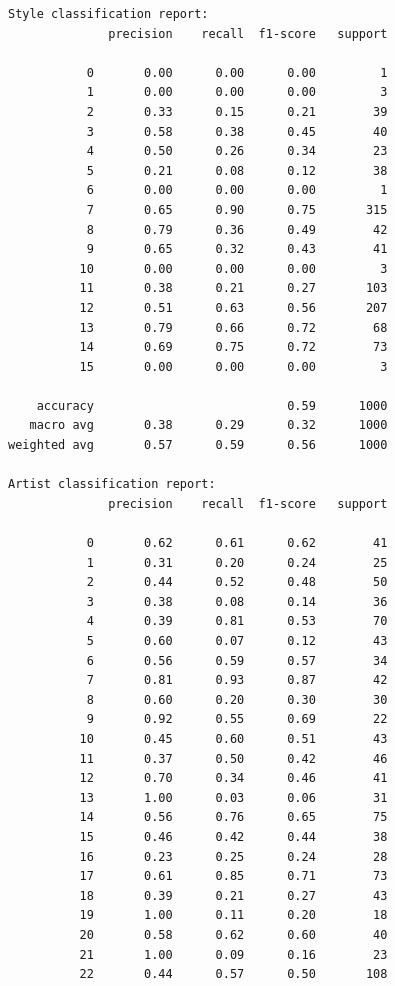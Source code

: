 \documentclass[11pt]{article}
\begin{document}
    
    \begin{Verbatim}[commandchars=\\\{\}]
Style classification report:
              precision    recall  f1-score   support

           0       0.00      0.00      0.00         1
           1       0.00      0.00      0.00         3
           2       0.33      0.15      0.21        39
           3       0.58      0.38      0.45        40
           4       0.50      0.26      0.34        23
           5       0.21      0.08      0.12        38
           6       0.00      0.00      0.00         1
           7       0.65      0.90      0.75       315
           8       0.79      0.36      0.49        42
           9       0.65      0.32      0.43        41
          10       0.00      0.00      0.00         3
          11       0.38      0.21      0.27       103
          12       0.51      0.63      0.56       207
          13       0.79      0.66      0.72        68
          14       0.69      0.75      0.72        73
          15       0.00      0.00      0.00         3

    accuracy                           0.59      1000
   macro avg       0.38      0.29      0.32      1000
weighted avg       0.57      0.59      0.56      1000

Artist classification report:
              precision    recall  f1-score   support

           0       0.62      0.61      0.62        41
           1       0.31      0.20      0.24        25
           2       0.44      0.52      0.48        50
           3       0.38      0.08      0.14        36
           4       0.39      0.81      0.53        70
           5       0.60      0.07      0.12        43
           6       0.56      0.59      0.57        34
           7       0.81      0.93      0.87        42
           8       0.60      0.20      0.30        30
           9       0.92      0.55      0.69        22
          10       0.45      0.60      0.51        43
          11       0.37      0.50      0.42        46
          12       0.70      0.34      0.46        41
          13       1.00      0.03      0.06        31
          14       0.56      0.76      0.65        75
          15       0.46      0.42      0.44        38
          16       0.23      0.25      0.24        28
          17       0.61      0.85      0.71        73
          18       0.39      0.21      0.27        43
          19       1.00      0.11      0.20        18
          20       0.58      0.62      0.60        40
          21       1.00      0.09      0.16        23
          22       0.44      0.57      0.50       108


\end{Verbatim}
\end{document}
